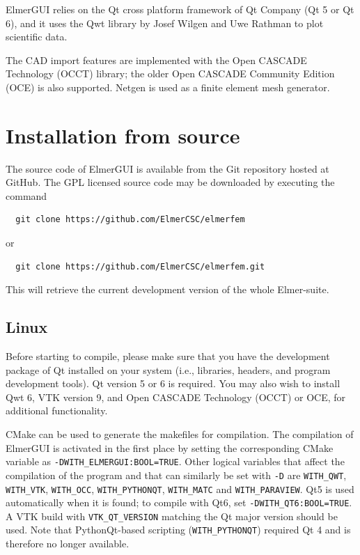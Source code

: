 ElmerGUI relies on the Qt cross platform framework of Qt Company\cite{QtHome} (Qt 5 or Qt 6), and it uses the Qwt
library by Josef Wilgen and Uwe Rathman\cite{QwtHome} to plot scientific data.

The CAD import features are implemented with the Open CASCADE Technology (OCCT) library\cite{OCCHome};
the older Open CASCADE Community Edition (OCE) is also supported. Netgen\cite{NetgenHome} is used
as a finite element mesh generator.

\chapter{Installation from source}

The source code of ElmerGUI is available from the Git repository hosted at GitHub. The GPL
licensed source code may be downloaded by executing the command 
\begin{verbatim}
  git clone https://github.com/ElmerCSC/elmerfem
\end{verbatim}
or
\begin{verbatim}
  git clone https://github.com/ElmerCSC/elmerfem.git
\end{verbatim}
\noindent This will retrieve the current development version of the whole Elmer-suite.

\section{Linux}

Before starting to compile, please make sure that you have the development package of Qt
installed on your system (i.e., libraries, headers, and program development tools). Qt version 5
or 6 is required. You may also wish to install Qwt 6,
VTK version 9,
and Open CASCADE Technology (OCCT) or OCE, for additional functionality. 

CMake can be used to generate the makefiles for compilation. The compilation of ElmerGUI is activated 
in the first place by setting the corresponding CMake variable as {\tt -DWITH\_ELMERGUI:BOOL=TRUE}. 
Other logical variables that affect the compilation of the program and that can similarly be set 
with {\tt -D} are {\tt WITH\_QWT}, {\tt WITH\_VTK},
{\tt WITH\_OCC}, {\tt WITH\_PYTHONQT},
{\tt WITH\_MATC} and {\tt WITH\_PARAVIEW}. Qt5 is used automatically when it is found;
to compile with Qt6, set {\tt -DWITH\_QT6:BOOL=TRUE}. A VTK build with {\tt VTK\_QT\_VERSION}
matching the Qt major version should be used. Note that PythonQt-based scripting
({\tt WITH\_PYTHONQT}) required Qt 4 and is therefore no longer available.

